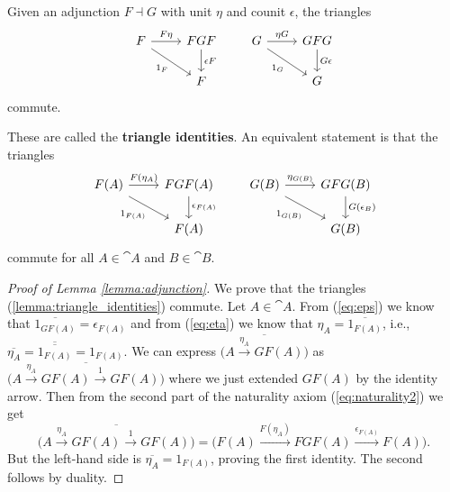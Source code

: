\documentclass[11pt,a4paper]{article}
\begin{document}
\begin{lemma}\label{lemma:adjunction}
    Given an adjunction $F\dashv G$ with unit $\eta$ and counit $\epsilon$, the triangles
    \begin{equation*}
    \begin{tikzcd}
        F \arrow[r, "F\eta"] \arrow[dr, "1_F"'] & FGF \arrow[d, "\epsilon F"] \\
        & F
    \end{tikzcd}
    \qquad
    \begin{tikzcd}
        G \arrow[r, "\eta G"] \arrow[dr, "1_G"'] & GFG \arrow[d, "G\epsilon"] \\
        & G
    \end{tikzcd}
    \end{equation*}
    commute.
\end{lemma}
\begin{remark}
    These are called the \textbf{triangle identities}. An equivalent statement is that the triangles
    \begin{equation}\label{lemma:triangle_identities}
    \begin{tikzcd}
        F(A) \arrow[r, "F(\eta_A)"] \arrow[dr, "1_{F(A)}"'] & FGF(A) \arrow[d, "\epsilon_{F(A)}"] \\
        & F(A)
    \end{tikzcd}
    \qquad
    \begin{tikzcd}
        G(B) \arrow[r, "\eta_{G(B)}"] \arrow[dr, "1_{G(B)}"'] & GFG(B) \arrow[d, "G(\epsilon_B)"] \\
        & G(B)
    \end{tikzcd}
    \end{equation}
    commute for all $A\in\cat{A}$ and $B\in\cat{B}$.
\end{remark}
\begin{proof}[Proof of Lemma \ref{lemma:adjunction}]
    We prove that the triangles (\ref{lemma:triangle_identities}) commute. Let $A\in\cat{A}$. From (\ref{eq:eps}) we know that $\overline{1_{GF(A)}}=\epsilon_{F(A)}$ and from (\ref{eq:eta}) we know that $\eta_A = \overline{1_{F(A)}}$, i.e., $\overline{\eta_A}=\overline{\overline{1_{F(A)}}}=1_{F(A)}$. We can express $\overline{\big( A\xrightarrow{\eta_A}GF(A)\big)}$ as $\overline{\big( A\xrightarrow{\eta_A} GF(A) \xrightarrow{1} GF(A) \big)}$ where we just extended $GF(A)$ by the identity arrow. Then from the second part of the naturality axiom (\ref{eq:naturality2}) we get
    \begin{equation*}
        \overline{\big( A\xrightarrow{\eta_A} GF(A) \xrightarrow{1} GF(A) \big)} = \big( F(A) \xrightarrow{F(\eta_A)} FGF(A) \xrightarrow{\epsilon_{F(A)}} F(A) \big).
    \end{equation*}
    But the left-hand side is $\overline{\eta_A}=1_{F(A)}$, proving the first identity. The second follows by duality.
\end{proof}
\end{document}

